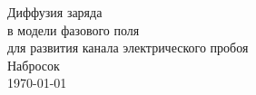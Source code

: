 \documentclass[a4paper,12pt]{article}
\theoremstyle{plain}
\theoremstyle{remark}
\newcommand{\customtitle}{%
    \begin{center}
        {
            \Large
            Диффузия заряда \\ в модели фазового поля \\ для развития канала электрического пробоя \\[6mm]
        }
        Набросок \\[5mm]
        \today
    \end{center}
}
\begin{document}
\customtitle












\tableofcontents
\end{document}
